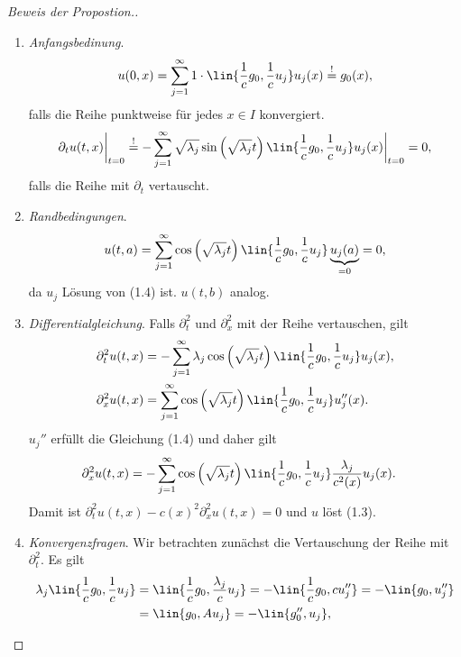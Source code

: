 \begin{proof}[Beweis der Propostion.]
\begin{enumerate}[label=\arabic{*}.)]
\item \textit{Anfangsbedinung}.
\begin{align*}
u(0,x) = \sum\limits_{j=1}^\infty
1\cdot \lin{\frac{1}{c}g_0,\frac{1}{c}u_j}u_j(x) \overset{!}{=} g_0(x),
\end{align*} 
falls die Reihe punktweise für jedes $x\in I$ konvergiert.
\begin{align*}
\partial_t u(t,x)\bigg|_{t=0} \overset{!}{=} -\sum\limits_{j=1}^\infty
\sqrt{\lambda_j}\sin\left(\sqrt{\lambda_j}t\right)\lin{\frac{1}{c}g_0,\frac{1}{c}u_j}u_j(x)\bigg|_{t=0}
= 0,
\end{align*}
falls die Reihe mit $\partial_t$ vertauscht.
\item \textit{Randbedingungen}.
\begin{align*}
u(t,a) = \sum\limits_{j=1}^\infty
\cos\left(\sqrt{\lambda_j}t\right)\lin{\frac{1}{c}g_0,\frac{1}{c}u_j}\underbrace{u_j(a)}_{=0}
= 0,
\end{align*}
da $u_j$ Lösung von (1.4) ist. $u(t,b)$ analog.
\item \textit{Differentialgleichung}. Falls $\partial_t^2$ und $\partial_x^2$
mit der Reihe vertauschen, gilt
\begin{align*}
&\partial_t^2 u(t,x) = -\sum\limits_{j=1}^\infty \lambda_j
\cos\left(\sqrt{\lambda_j}t\right)\lin{\frac{1}{c}g_0,\frac{1}{c}u_j}u_j(x),\\
&\partial_x^2 u(t,x) = \sum\limits_{j=1}^\infty 
\cos\left(\sqrt{\lambda_j}t\right)\lin{\frac{1}{c}g_0,\frac{1}{c}u_j}u_j''(x).
\end{align*}
$u_j''$ erfüllt die Gleichung (1.4) und daher gilt
\begin{align*}
&\partial_x^2 u(t,x) = -\sum\limits_{j=1}^\infty 
\cos\left(\sqrt{\lambda_j}t\right)\lin{\frac{1}{c}g_0,\frac{1}{c}u_j}\frac{\lambda_j}{c^2(x)}u_j(x).
\end{align*}
Damit ist $\partial_t^2 u(t,x) - c(x)^2\partial_x^2u(t,x) = 0$ und $u$ löst
(1.3).
\item \textit{Konvergenzfragen}. Wir betrachten zunächst die Vertauschung der
Reihe mit $\partial_t^2$. Es gilt 
\begin{align*}
\lambda_j\lin{\frac{1}{c}g_0,\frac{1}{c}u_j}
&= \lin{\frac{1}{c}g_0,\frac{\lambda_j}{c}u_j}
= -\lin{\frac{1}{c}g_0,cu_j''}
= -\lin{g_0,u_j''} \\ 
&= \lin{g_0,Au_j} = -\lin{g_0'',u_j},
\end{align*}

\end{enumerate}
\end{proof}
